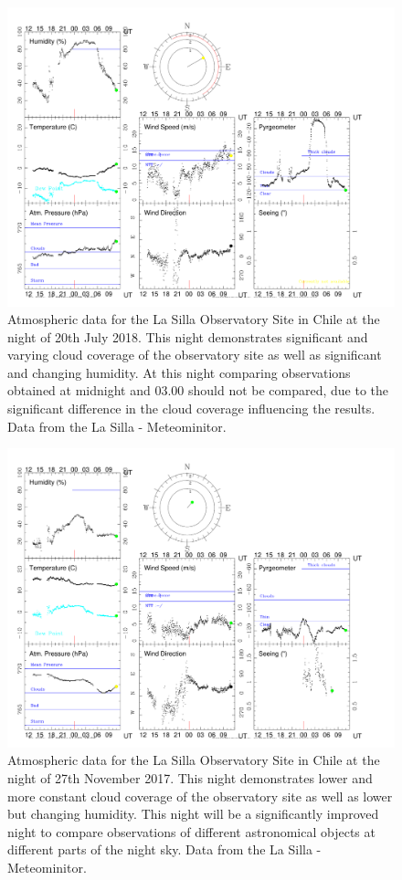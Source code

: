 \documentclass[a4paper, 12pt, twoside]{article}
\begin{document}
%
\begin{figure}[htp!]
\includegraphics[width=1.1\linewidth]{Figure/end180720.pdf}
\caption{Atmospheric data for the La Silla Observatory Site in Chile at the night of 20th July 2018. This night demonstrates significant and varying cloud coverage of the observatory site as well as significant and changing humidity. At this night comparing observations obtained at midnight and 03.00 should not be compared, due to the significant difference in the cloud coverage influencing the results. Data from the La Silla - Meteominitor.}
\label{fig:poor_night}
\end{figure}

\begin{figure}[htp!]
\includegraphics[width=1.1\linewidth]{Figure/end171127.pdf}
\caption{Atmospheric data for the La Silla Observatory Site in Chile at the night of 27th November 2017. This night demonstrates lower and more constant cloud coverage of the observatory site as well as lower but changing humidity. This night will be a significantly improved night to compare observations of different astronomical objects at different parts of the night sky. Data from the La Silla - Meteominitor.}
\label{fig:good_night}
\end{figure}
\end{document}
